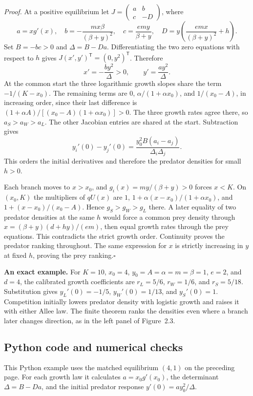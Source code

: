 \textit{Proof.} At a positive equilibrium let $J=\left(\begin{smallmatrix}a&b\\c&-D\end{smallmatrix}\right)$, where
\[
 a=xg'(x),\quad b=-\frac{mx\beta}{(\beta+y)^2},\quad
 c=\frac{emy}{\beta+y},\quad D=y\left(\frac{emx}{(\beta+y)^2}+h\right).
\]
Set $B=-bc>0$ and $\Delta=B-Da$. Differentiating the two zero equations with respect to $h$ gives $J(x',y')^{\mathsf T}=(0,y^2)^{\mathsf T}$. Therefore
\[
 x'=-\frac{by^2}{\Delta}>0,\qquad y'=\frac{ay^2}{\Delta} .
\]
At the common start the three logarithmic growth slopes share the term $-1/(K-x_0)$. The remaining terms are $0$, $\alpha/(1+\alpha x_0)$, and $1/(x_0-A)$, in increasing order, since their last difference is $(1+\alpha A)/[(x_0-A)(1+\alpha x_0)]>0$. The three growth rates agree there, so $a_S>a_W>a_L$. The other Jacobian entries are shared at the start. Subtraction gives
\[
 y_i'(0)-y_j'(0)=\frac{y_0^2B(a_i-a_j)}{\Delta_i\Delta_j}.
\]
This orders the initial derivatives and therefore the predator densities for small $h>0$.

Each branch moves to $x>x_0$, and $g_i(x)=my/(\beta+y)>0$ forces $x<K$. On $(x_0,K)$ the multipliers of $qU(x)$ are $1$, $1+\alpha(x-x_0)/(1+\alpha x_0)$, and $1+(x-x_0)/(x_0-A)$. Hence $g_S>g_W>g_L$ there. A later equality of two predator densities at the same $h$ would force a common prey density through $x=(\beta+y)(d+hy)/(em)$, then equal growth rates through the prey equations. This contradicts the strict growth order. Continuity proves the predator ranking throughout. The same expression for $x$ is strictly increasing in $y$ at fixed $h$, proving the prey ranking.\hfill$\square$

\textbf{An exact example.} For $K=10$, $x_0=4$, $y_0=A=\alpha=m=\beta=1$, $e=2$, and $d=4$, the calibrated growth coefficients are $r_L=5/6$, $r_W=1/6$, and $r_S=5/18$. Substitution gives $y_L'(0)=-1/5$, $y_W'(0)=1/13$, and $y_S'(0)=1$. Competition initially lowers predator density with logistic growth and raises it with either Allee law. The finite theorem ranks the densities even where a branch later changes direction, as in the left panel of Figure~2.3.

\clearpage
\subsection*{Python code and numerical checks}
This Python example uses the matched equilibrium $(4,1)$ on the preceding page. For each growth law it calculates $a=x_0g'(x_0)$, the determinant $\Delta=B-Da$, and the initial predator response $y'(0)=ay_0^2/\Delta$.

